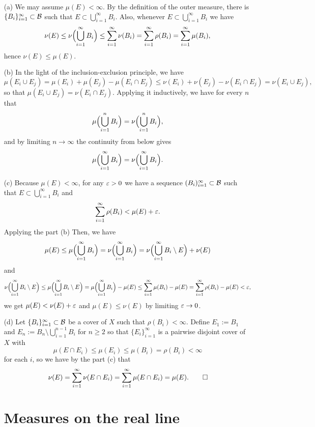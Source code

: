 \documentclass{../../large}
\begin{document}
\begin{pf}
(a)
We may assume $\mu(E)<\infty$.
By the definition of the outer measure, there is $\{B_i\}_{i=1}^\infty\subset\mathcal{B}$ such that $E\subset\bigcup_{i=1}^\infty B_i$.
Also, whenever $E\subset\bigcup_{i=1}^\infty B_i$ we have
\[\nu(E)\le\nu\Bigl(\bigcup_{i=1}^\infty B_i\Bigr)\le\sum_{i=1}^\infty\nu(B_i)=\sum_{i=1}^\infty\rho(B_i)=\sum_{i=1}^\infty\mu(B_i),\]
hence $\nu(E)\le\mu(E)$.

(b)
In the light of the inclusion-exclusion principle, we have
\[\mu(E_i\cup E_j)=\mu(E_i)+\mu(E_j)-\mu(E_i\cap E_j)\le\nu(E_i)+\nu(E_j)-\nu(E_i\cap E_j)=\nu(E_i\cup E_j),\]
so that $\mu(E_i\cup E_j)=\nu(E_i\cap E_j)$.
Applying it inductively, we have for every $n$ that
\[\mu\Bigl(\bigcup_{i=1}^nB_i\Bigr)=\nu\Bigl(\bigcup_{i=1}^nB_i\Bigr),\]
and by limiting $n\to\infty$ the continuity from below gives
\[\mu\Bigl(\bigcup_{i=1}^\infty B_i\Bigr)=\nu\Bigl(\bigcup_{i=1}^\infty B_i\Bigr).\]

(c)
Because $\mu(E)<\infty$, for any $\varepsilon>0$ we have a sequence $(B_i)_{i=1}^\infty\subset\mathcal{B}$ such that $E\subset\bigcup_{i=1}^\infty B_i$ and
\[\sum_{i=1}^\infty\rho(B_i)<\mu(E)+\varepsilon.\]
Applying the part (b) 
Then, we have
\[\mu(E)\le\mu\Bigl(\bigcup_{i=1}^\infty B_i\Bigr)=\nu\Bigl(\bigcup_{i=1}^\infty B_i\Bigr)=\nu\Bigl(\bigcup_{i=1}^\infty B_i\setminus E\Bigr)+\nu(E)\]
and
\[\nu\Bigl(\bigcup_{i=1}^\infty B_i\setminus E\Bigr)
\le\mu\Bigl(\bigcup_{i=1}^\infty B_i\setminus E\Bigr)
=\mu\Bigl(\bigcup_{i=1}^\infty B_i\Bigr)-\mu(E)
\le\sum_{i=1}^\infty\mu(B_i)-\mu(E)=\sum_{i=1}^\infty\rho(B_i)-\mu(E)<\varepsilon,\]
we get $\mu(E)<\nu(E)+\varepsilon$ and $\mu(E)\le\nu(E)$ by limiting $\varepsilon\to0$.

(d)
Let $\{B_i\}_{i=1}^\infty\subset\mathcal{B}$ be a cover of $X$ such that $\rho(B_i)<\infty$.
Define $E_1:=B_1$ and $E_n:=B_n\setminus\bigcup_{i=1}^{n-1}B_i$ for $n\ge2$ so that $\{E_i\}_{i=1}^\infty$ is a pairwise disjoint cover of $X$ with
\[\mu(E\cap E_i)\le\mu(E_i)\le\mu(B_i)=\rho(B_i)<\infty\]
for each $i$, so we have by the part (c) that
\[\nu(E)=\sum_{i=1}^\infty\nu(E\cap E_i)=\sum_{i=1}^\infty\mu(E\cap E_i)=\mu(E).\qedhere\]
\end{pf}



\section{Measures on the real line}


\begin{prb}
\end{prb}
\end{document}
